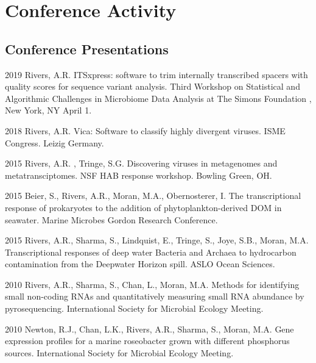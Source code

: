 \documentclass[12pt,letterpaper]{report}
\begin{document}
  
    \section*{Conference Activity}


    \subsection*{Conference Presentations}

    \begin{tablist}
    	
\item[2019 ] \tab Rivers, A.R. ITSxpress: software to trim internally transcribed spacers with quality scores for sequence variant analysis. Third Workshop on Statistical and Algorithmic Challenges in Microbiome Data Analysis at The Simons Foundation , New York, NY April 1. 

\item[2018 ] \tab Rivers, A.R. Vica: Software to classify highly divergent viruses. ISME Congress. Leizig Germany.

\item[2015 ] \tab Rivers, A.R. , Tringe, S.G. Discovering viruses in metagenomes and metatransciptomes. NSF HAB response workshop. Bowling Green, OH.

\item[2015 ] \tab  Beier, S., Rivers, A.R., Moran, M.A., Obernosterer, I. The transcriptional response of prokaryotes to the addition of phytoplankton-derived DOM in seawater. Marine Microbes Gordon Research Conference. 

\item[2015] \tab Rivers, A.R., Sharma, S., Lindquist, E., Tringe, S., Joye, S.B., Moran, M.A.  Transcriptional responses of deep water Bacteria and Archaea to hydrocarbon contamination from the Deepwater Horizon spill. ASLO Ocean Sciences. 

\item[2010] \tab Rivers, A.R., Sharma, S., Chan, L., Moran, M.A. Methods for identifying small non-coding RNAs and quantitatively measuring small RNA abundance by pyrosequencing. International Society for Microbial Ecology Meeting.

\item[2010] \tab Newton, R.J., Chan, L.K., Rivers, A.R., Sharma, S., Moran, M.A.  Gene expression profiles for a marine roseobacter grown with different phosphorus sources. International Society for Microbial Ecology Meeting.


\end{tablist}
\end{document}
